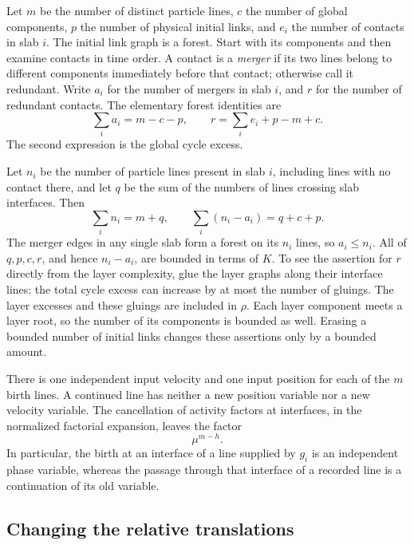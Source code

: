 Let \(m\) be the number of distinct particle lines, \(c\) the number of
global components, \(p\) the number of physical initial links, and
\(e_i\) the number of contacts in slab \(i\).  The initial link graph is
a forest.  Start with its components and then examine contacts in time
order.  A contact is a \emph{merger} if its two lines belong to different
components immediately before that contact; otherwise call it redundant.
Write \(a_i\) for the number of mergers in slab \(i\), and \(r\) for
the number of redundant contacts.  The elementary forest identities are
\begin{equation}\label{eq:sharp-merger-count}
 \sum_i a_i=m-c-p,
 \qquad
 r=\sum_i e_i+p-m+c.
\end{equation}
The second expression is the global cycle excess.

Let \(n_i\) be the number of particle lines present in slab \(i\),
including lines with no contact there, and let \(q\) be the sum of the
numbers of lines crossing slab interfaces.  Then
\begin{equation}\label{eq:sharp-line-count}
 \sum_i n_i=m+q,
 \qquad
 \sum_i(n_i-a_i)=q+c+p.
\end{equation}
The merger edges in any single slab form a forest on its \(n_i\)
lines, so \(a_i\le n_i\).  All of \(q,p,c,r\), and hence
\(n_i-a_i\), are bounded in terms of \(K\).  To see the assertion for
\(r\) directly from the layer complexity, glue the layer graphs along
their interface lines: the total cycle excess can increase by at most
the number of gluings.  The layer excesses and these gluings are included
in \(\rho\).  Each layer component meets a layer root, so the number of
its components is bounded as well.  Erasing a bounded number of initial
links changes these assertions only by a bounded amount.

There is one independent input velocity and one input position for each
of the \(m\) birth lines.  A continued line has neither a new position
variable nor a new velocity variable.  The cancellation of activity
factors at interfaces, in the normalized factorial expansion, leaves
the factor
\begin{equation}\label{eq:sharp-activity}
                         \mu^{m-h}.
\end{equation}
In particular, the birth at an interface of a line supplied by \(g_i\)
is an independent phase variable, whereas the passage through that
interface of a recorded line is a continuation of its old variable.

\subsection{Changing the relative translations}


